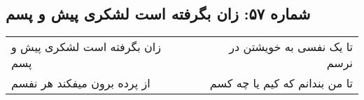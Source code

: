 \begin{center}
\section*{شماره ۵۷: زان بگرفته است لشکری پیش و پسم}
\label{sec:057}
\begin{longtable}{l p{0.5cm} r}
زان بگرفته است لشکری پیش و پسم
&&
تا یک نفسی به خویشتن در نرسم
\\
از پرده برون میفکند هر نفسم
&&
تا من بندانم که کیم یا چه کسم
\\
\end{longtable}
\end{center}
